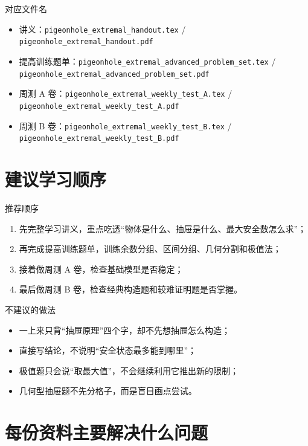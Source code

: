 \documentclass[11pt,a4paper,fontset=fandol]{ctexart}
\begin{document}
\begin{infobox}{对应文件名}
\begin{itemize}
  \item 讲义：\texttt{pigeonhole\_extremal\_handout.tex} / \texttt{pigeonhole\_extremal\_handout.pdf}
  \item 提高训练题单：\texttt{pigeonhole\_extremal\_advanced\_problem\_set.tex} / \texttt{pigeonhole\_extremal\_advanced\_problem\_set.pdf}
  \item 周测 A 卷：\texttt{pigeonhole\_extremal\_weekly\_test\_A.tex} / \texttt{pigeonhole\_extremal\_weekly\_test\_A.pdf}
  \item 周测 B 卷：\texttt{pigeonhole\_extremal\_weekly\_test\_B.tex} / \texttt{pigeonhole\_extremal\_weekly\_test\_B.pdf}
\end{itemize}
\end{infobox}

\section{建议学习顺序}

\begin{goalbox}{推荐顺序}
\begin{enumerate}
  \item 先完整学习讲义，重点吃透“物体是什么、抽屉是什么、最大安全数怎么求”；
  \item 再完成提高训练题单，训练余数分组、区间分组、几何分割和极值法；
  \item 接着做周测 A 卷，检查基础模型是否稳定；
  \item 最后做周测 B 卷，检查经典构造题和较难证明题是否掌握。
\end{enumerate}
\end{goalbox}

\begin{warnbox}{不建议的做法}
\begin{itemize}
  \item 一上来只背“抽屉原理”四个字，却不先想抽屉怎么构造；
  \item 直接写结论，不说明“安全状态最多能到哪里”；
  \item 极值题只会说“取最大值”，不会继续利用它推出新的限制；
  \item 几何型抽屉题不先分格子，而是盲目画点尝试。
\end{itemize}
\end{warnbox}

\section{每份资料主要解决什么问题}
\end{document}
